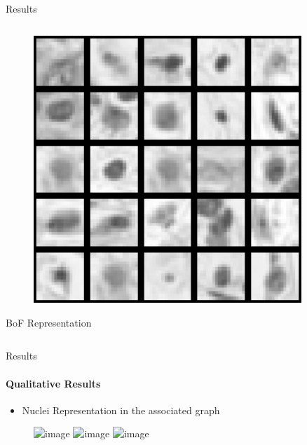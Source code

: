 \documentclass[usenames,dvipsnames]{beamer}
\begin{document}
\begin{frame}{Results}
\begin{columns}[t, totalwidth=1\textwidth]
\begin{column}{0.5\textwidth}
\begin{center}
\begin{figure}
\includegraphics[width=0.9\textwidth]{imagenes/diccionario_test.png}
\end{figure}
\centering\small BoF Representation
\end{center} 
\end{column}
\end{columns}
\end{frame}


\begin{frame}{Results}
\framesubtitle{Qualitative Results}
\begin{itemize}
\item Nuclei Representation in the associated graph
\end{itemize}
\begin{figure}
\includegraphics<1>[width=0.85\textwidth]{imagenes/grafo1a.png}
\includegraphics<2>[width=0.85\textwidth]{imagenes/grafo2a.png}
\includegraphics<3>[width=0.85\textwidth]{imagenes/grafo3a.png}
\end{figure}

\small\centering
{}
\small\centering
{}
\small\centering
{}
\end{frame}
\end{document}
